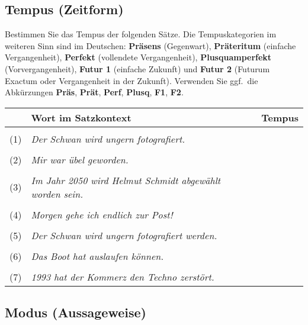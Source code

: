 \documentclass[12pt,a4paper,twoside]{article}
\newcommand{\praesenzaufgabe}{}
\newcommand{\praesenzaufgabe}{\textbf{Präsenzaufgabe!}\ |\ }
\begin{document}
\begin{ignorable}

\subsection{\praesenzaufgabe Tempus (Zeitform)}

Bestimmen Sie das Tempus der folgenden Sätze.
Die Tempuskategorien im weiteren Sinn sind im Deutschen: \textbf{Präsens} (Gegenwart), \textbf{Präteritum} (einfache Vergangenheit), \textbf{Perfekt} (vollendete Vergangenheit), \textbf{Plusquamperfekt} (Vorvergangenheit), \textbf{Futur 1} (einfache Zukunft) und \textbf{Futur 2} (Futurum Exactum oder Vergangenheit in der Zukunft).
Verwenden Sie ggf.\ die Abkürzungen \textbf{Präs}, \textbf{Prät}, \textbf{Perf}, \textbf{Plusq}, \textbf{F1}, \textbf{F2}.

\begin{center}
  \begin{tabular}[h]{clp{}}
    \toprule
    & \textbf{Wort im Satzkontext} & \textbf{Tempus} \\
    \midrule
    && \\
    (1) & \textit{Der Schwan wird ungern fotografiert.}                     &  \\ \cline{3-3}
    && \\
    (2) & \textit{Mir war übel geworden.}                                   &  \\ \cline{3-3}
    && \\
    (3) & \textit{Im  Jahr 2050 wird Helmut Schmidt abgewählt worden sein.} &  \\ \cline{3-3}
    && \\
    (4) & \textit{Morgen gehe ich endlich zur Post!}                        &  \\ \cline{3-3}
    && \\
    (5) & \textit{Der Schwan wird ungern fotografiert werden.}              &  \\ \cline{3-3}
    && \\
    (6) & \textit{Das Boot hat auslaufen können.}                           &  \\ \cline{3-3}
    && \\
    (7) & \textit{1993 hat der Kommerz den Techno zerstört.}                &  \\ \cline{3-3}
  \end{tabular}
\end{center}

\subsection{\praesenzaufgabe Modus (Aussageweise)}


\end{ignorable}
\end{document}
